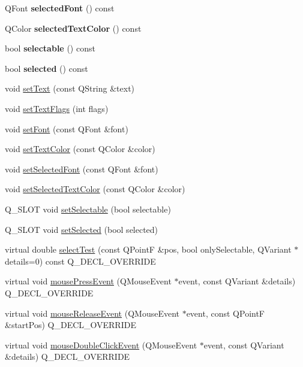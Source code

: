 \begin{DoxyCompactItemize}
Q\+Font {\bfseries selected\+Font} () const
\item 
\mbox{\label{class_q_c_p_text_element_a98616fa5c33f1eaee0428191ece39686}} 
Q\+Color {\bfseries selected\+Text\+Color} () const
\item 
\mbox{\label{class_q_c_p_text_element_a96e2a712fca40324a8489f75833b4096}} 
bool {\bfseries selectable} () const
\item 
\mbox{\label{class_q_c_p_text_element_a135d1ad0aa97a245b4247c3292ff551c}} 
bool {\bfseries selected} () const
\item 
void \hyperlink{class_q_c_p_text_element_ac44b81e69e719b879eb2feecb33557e2}{set\+Text} (const Q\+String \&text)
\item 
void \hyperlink{class_q_c_p_text_element_ab908f437f552020888a3ad8cf8242605}{set\+Text\+Flags} (int flags)
\item 
void \hyperlink{class_q_c_p_text_element_a09b3241769528fa87cb4bf35c97defad}{set\+Font} (const Q\+Font \&font)
\item 
void \hyperlink{class_q_c_p_text_element_a4f3b8361c3ffb3f84346954929ce93ba}{set\+Text\+Color} (const Q\+Color \&color)
\item 
void \hyperlink{class_q_c_p_text_element_a0a2397a3c4ede519e16ab3e991904065}{set\+Selected\+Font} (const Q\+Font \&font)
\item 
void \hyperlink{class_q_c_p_text_element_abaec200cae70a0eade53583defc0476d}{set\+Selected\+Text\+Color} (const Q\+Color \&color)
\item 
Q\+\_\+\+S\+L\+OT void \hyperlink{class_q_c_p_text_element_a3c5f9b1897a036b16495ed3fb8371c55}{set\+Selectable} (bool selectable)
\item 
Q\+\_\+\+S\+L\+OT void \hyperlink{class_q_c_p_text_element_aba5521f9fb22a5f3d2f09ab37d4a1751}{set\+Selected} (bool selected)
\item 
virtual double \hyperlink{class_q_c_p_text_element_a1e721bc2994a127ef5a8f0a514a5dbac}{select\+Test} (const Q\+PointF \&pos, bool only\+Selectable, Q\+Variant $\ast$details=0) const Q\+\_\+\+D\+E\+C\+L\+\_\+\+O\+V\+E\+R\+R\+I\+DE
\item 
virtual void \hyperlink{class_q_c_p_text_element_ad7b2c98355e3d2f912574b74fcee0574}{mouse\+Press\+Event} (Q\+Mouse\+Event $\ast$event, const Q\+Variant \&details) Q\+\_\+\+D\+E\+C\+L\+\_\+\+O\+V\+E\+R\+R\+I\+DE
\item 
virtual void \hyperlink{class_q_c_p_text_element_acfcbaf9b1da18745e72726aafb39c855}{mouse\+Release\+Event} (Q\+Mouse\+Event $\ast$event, const Q\+PointF \&start\+Pos) Q\+\_\+\+D\+E\+C\+L\+\_\+\+O\+V\+E\+R\+R\+I\+DE
\item 
virtual void \hyperlink{class_q_c_p_text_element_a2272ff775ab385f612e9fd39773de7c0}{mouse\+Double\+Click\+Event} (Q\+Mouse\+Event $\ast$event, const Q\+Variant \&details) Q\+\_\+\+D\+E\+C\+L\+\_\+\+O\+V\+E\+R\+R\+I\+DE
\end{DoxyCompactItemize}
